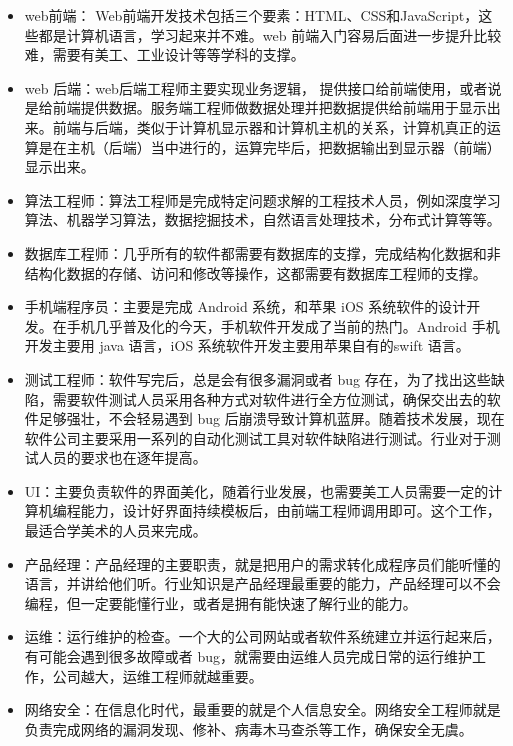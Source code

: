 \documentclass{article}
\begin{document}
\begin{enumerate}
\begin{itemize}
\item web前端： Web前端开发技术包括三个要素：HTML、CSS和JavaScript，这些都是计算机语言，学习起来并不难。web 前端入门容易后面进一步提升比较难，需要有美工、工业设计等等学科的支撑。\par
\item web 后端：web后端工程师主要实现业务逻辑， 提供接口给前端使用，或者说是给前端提供数据。服务端工程师做数据处理并把数据提供给前端用于显示出来。前端与后端，类似于计算机显示器和计算机主机的关系，计算机真正的运算是在主机（后端）当中进行的，运算完毕后，把数据输出到显示器（前端）显示出来。\par
\item 算法工程师：算法工程师是完成特定问题求解的工程技术人员，例如深度学习算法、机器学习算法，数据挖掘技术，自然语言处理技术，分布式计算等等。\par
\item 数据库工程师：几乎所有的软件都需要有数据库的支撑，完成结构化数据和非结构化数据的存储、访问和修改等操作，这都需要有数据库工程师的支撑。\par
\item 手机端程序员：主要是完成 Android 系统，和苹果 iOS 系统软件的设计开发。在手机几乎普及化的今天，手机软件开发成了当前的热门。Android 手机开发主要用 java 语言，iOS 系统软件开发主要用苹果自有的swift 语言。\par
\item 测试工程师：软件写完后，总是会有很多漏洞或者 bug 存在，为了找出这些缺陷，需要软件测试人员采用各种方式对软件进行全方位测试，确保交出去的软件足够强壮，不会轻易遇到 bug 后崩溃导致计算机蓝屏。随着技术发展，现在软件公司主要采用一系列的自动化测试工具对软件缺陷进行测试。行业对于测试人员的要求也在逐年提高。\par
\item UI：主要负责软件的界面美化，随着行业发展，也需要美工人员需要一定的计算机编程能力，设计好界面持续模板后，由前端工程师调用即可。这个工作，最适合学美术的人员来完成。\par
\item 产品经理：产品经理的主要职责，就是把用户的需求转化成程序员们能听懂的语言，并讲给他们听。行业知识是产品经理最重要的能力，产品经理可以不会编程，但一定要能懂行业，或者是拥有能快速了解行业的能力。 \par
\item 运维：运行维护的检查。一个大的公司网站或者软件系统建立并运行起来后，有可能会遇到很多故障或者 bug，就需要由运维人员完成日常的运行维护工作，公司越大，运维工程师就越重要。\par
\item 网络安全：在信息化时代，最重要的就是个人信息安全。网络安全工程师就是负责完成网络的漏洞发现、修补、病毒木马查杀等工作，确保安全无虞。\par
\end{itemize}
\end{enumerate}
\end{document}
